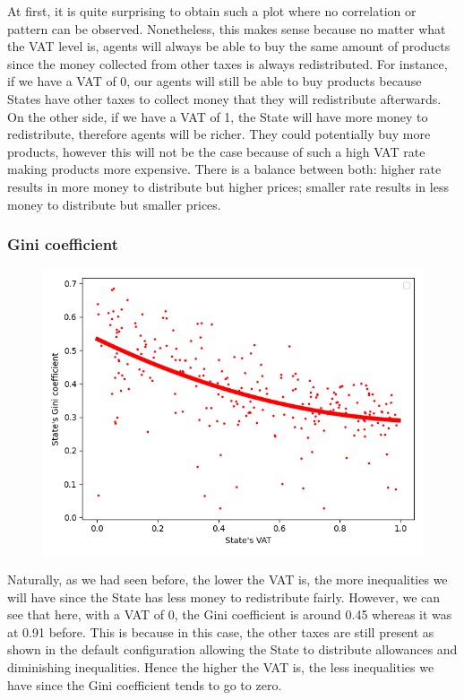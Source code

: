         { At first, it is quite surprising to obtain such a plot where no correlation or pattern can be observed. Nonetheless, this makes sense because no matter what the VAT level is, agents will always be able to buy the same amount of products since the money collected from other taxes is always redistributed. For instance, if we have a VAT of 0, our agents will still be able to buy products because States have other taxes to collect money that they will redistribute afterwards. On the other side, if we have a VAT of 1, the State will have more money to redistribute, therefore agents will be richer. They could potentially buy more products, however this will not be the case because of such a high VAT rate making products more expensive. There is a balance between both: higher rate results in more money to distribute but higher prices; smaller rate results in less money to distribute but smaller prices. 
        \par

        \subsubsection{Gini coefficient}

        \begin{figure}
            \includegraphics[width=\linewidth]{img/exp/2_3.png}
        \end{figure} 
        { Naturally, as we had seen before, the lower the VAT is, the more inequalities we will have since the State has less money to redistribute fairly. However, we can see that here, with a VAT of 0, the Gini coefficient is around 0.45 whereas it was at 0.91 before. This is because in this case, the other taxes are still present as shown in the default configuration allowing the State to distribute allowances and diminishing inequalities. Hence the higher the VAT is, the less inequalities we have since the Gini coefficient tends to go to zero.
        \par

}}
